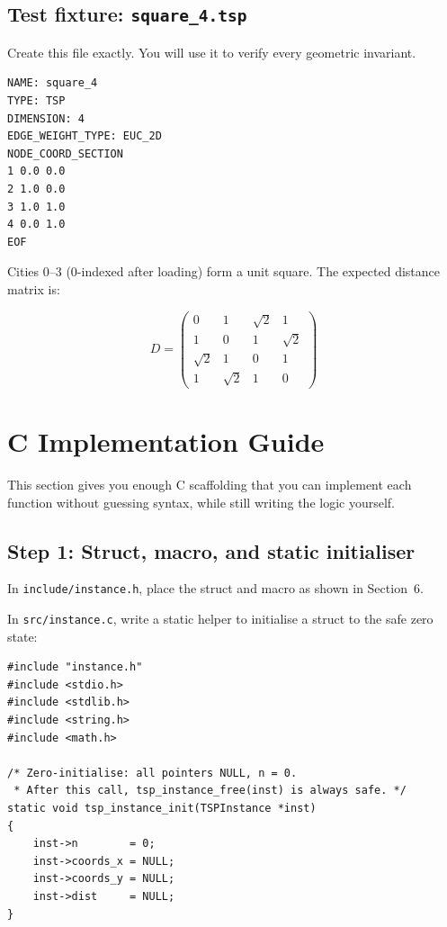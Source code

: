 \documentclass[11pt]{article}
\begin{document}
\subsection{Test fixture: \texttt{square\_4.tsp}}

Create this file exactly. You will use it to verify every geometric invariant.

\begin{lstlisting}[style=cstyle, language={}, numbers=none]
NAME: square_4
TYPE: TSP
DIMENSION: 4
EDGE_WEIGHT_TYPE: EUC_2D
NODE_COORD_SECTION
1 0.0 0.0
2 1.0 0.0
3 1.0 1.0
4 0.0 1.0
EOF
\end{lstlisting}

Cities 0--3 (0-indexed after loading) form a unit square. The expected distance matrix is:

\[
D = \begin{pmatrix}
0 & 1 & \sqrt{2} & 1 \\
1 & 0 & 1 & \sqrt{2} \\
\sqrt{2} & 1 & 0 & 1 \\
1 & \sqrt{2} & 1 & 0
\end{pmatrix}
\]

\newpage

\section{C Implementation Guide}

This section gives you enough C scaffolding that you can implement each function without guessing syntax, while still writing the logic yourself.

\subsection{Step 1: Struct, macro, and static initialiser}

In \texttt{include/instance.h}, place the struct and macro as shown in Section~6.

In \texttt{src/instance.c}, write a static helper to initialise a struct to the safe zero state:

\begin{lstlisting}[style=cstyle]
#include "instance.h"
#include <stdio.h>
#include <stdlib.h>
#include <string.h>
#include <math.h>

/* Zero-initialise: all pointers NULL, n = 0.
 * After this call, tsp_instance_free(inst) is always safe. */
static void tsp_instance_init(TSPInstance *inst)
{
    inst->n        = 0;
    inst->coords_x = NULL;
    inst->coords_y = NULL;
    inst->dist     = NULL;
}
\end{lstlisting}
\end{document}
